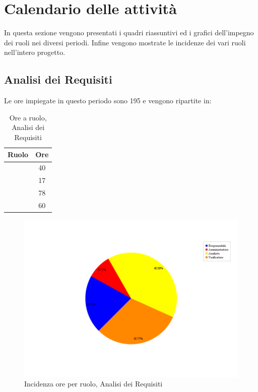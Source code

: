 \newpage
\section{Calendario delle attività}
In questa sezione vengono presentati i quadri riassuntivi ed i grafici dell'impegno dei ruoli nei diversi periodi. Infine vengono mostrate le incidenze dei vari ruoli nell'intero progetto.

\subsection{Analisi dei Requisiti}
Le ore impiegate in questo periodo sono 195 e vengono ripartite in:
\begin{table}[H]
	\begin{center}
		\begin{tabular}{|c|c|}
			\hline
			\textbf{Ruolo}	& \textbf{Ore} \\
			\hline
			\Res	&	40	\\
			\hline
			\Amm	&	17	\\
			\hline
			\Ana	&	78	\\
			\hline
			\Ver	&	60	\\
			\hline
		\end{tabular}
	\end{center}
	\caption{Ore a ruolo, Analisi dei Requisiti}
\end{table}

\begin{figure}[ht]
	\centering
	\includegraphics[scale=0.5]{immagini/Grafi/OreRuoloRR}
	\caption{Incidenza ore per ruolo, Analisi dei Requisiti}
\end{figure} \FloatBarrier

